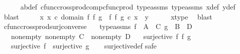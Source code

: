 \begin{isabellebody}
\ \ \ \ \isamarkupfalse%
\ ab{\isacharunderscore}{\kern0pt}def\ cfunc{\isacharunderscore}{\kern0pt}cross{\isacharunderscore}{\kern0pt}prod{\isacharunderscore}{\kern0pt}comp{\isacharunderscore}{\kern0pt}cfunc{\isacharunderscore}{\kern0pt}prod\ type{\isacharunderscore}{\kern0pt}assms{\isacharparenleft}{\kern0pt}{}{\isacharparenright}{\kern0pt}\ type{\isacharunderscore}{\kern0pt}assms{\isacharparenleft}{\kern0pt}{}{\isacharparenright}{\kern0pt}\ x{\isacharunderscore}{\kern0pt}def\ y{\isacharunderscore}{\kern0pt}def\ \isamarkupfalse%
\ blast\isanewline
\ \ \isamarkupfalse%
\ \isamarkupfalse%
\ {\isachardoublequoteopen}{\isasymexists}x{\isachardot}{\kern0pt}\ x\ {\isasymin}\isactrlsub c\ domain\ {\isacharparenleft}{\kern0pt}f\ {\isasymtimes}\isactrlsub f\ g{\isacharparenright}{\kern0pt}\ {\isasymand}\ {\isacharparenleft}{\kern0pt}f\ {\isasymtimes}\isactrlsub f\ g{\isacharparenright}{\kern0pt}\ {\isasymcirc}\isactrlsub c\ x\ {\isacharequal}{\kern0pt}\ y{\isachardoublequoteclose}\isanewline
\ \ \ \ \isamarkupfalse%
\ x{\isacharunderscore}{\kern0pt}type\ \isamarkupfalse%
\ blast\isanewline
{}\isamarkupfalse%
%
\endisatagproof
{\isafoldproof}%
%
\isadelimproof
\isanewline
%
\endisadelimproof
\isanewline
{}\isamarkupfalse%
\ cfunc{\isacharunderscore}{\kern0pt}cross{\isacharunderscore}{\kern0pt}prod{\isacharunderscore}{\kern0pt}surj{\isacharunderscore}{\kern0pt}converse{\isacharcolon}{\kern0pt}\isanewline
\ \ \ type{\isacharunderscore}{\kern0pt}assms{\isacharcolon}{\kern0pt}\ {\isachardoublequoteopen}f\ {\isacharcolon}{\kern0pt}\ A\ {\isasymrightarrow}\ C{\isachardoublequoteclose}\ {\isachardoublequoteopen}g\ {\isacharcolon}{\kern0pt}\ B\ {\isasymrightarrow}\ D{\isachardoublequoteclose}\isanewline
\ \ \ nonempty{\isacharcolon}{\kern0pt}\ {\isachardoublequoteopen}nonempty\ C\ {\isasymand}\ nonempty\ D{\isachardoublequoteclose}\isanewline
\ \ \ {\isachardoublequoteopen}surjective\ {\isacharparenleft}{\kern0pt}f\ {\isasymtimes}\isactrlsub f\ g{\isacharparenright}{\kern0pt}{\isachardoublequoteclose}\isanewline
\ \ \ {\isachardoublequoteopen}surjective\ f\ {\isasymand}\ surjective\ g{\isachardoublequoteclose}\isanewline
%
\isadelimproof
\ \ %
\endisadelimproof
%
\isatagproof
{}\isamarkupfalse%
\ surjective{\isacharunderscore}{\kern0pt}def\isanewline
{}\isamarkupfalse%
{\isacharparenleft}{\kern0pt}safe{\isacharparenright}{\kern0pt}\isanewline

\end{isabellebody}
